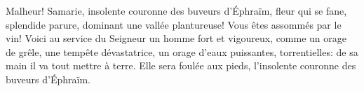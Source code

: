 Malheur! Samarie, insolente couronne des buveurs d’Éphraïm,
	fleur qui se fane, splendide parure, dominant une vallée plantureuse!
	Vous êtes assommés par le vin!
Voici au service du Seigneur un homme fort et vigoureux,
	comme un orage de grêle, une tempête dévastatrice,
	un orage d’eaux puissantes, torrentielles:
	de sa main il va tout mettre à terre.
Elle sera foulée aux pieds, l’insolente couronne des buveurs d’Éphraïm.

